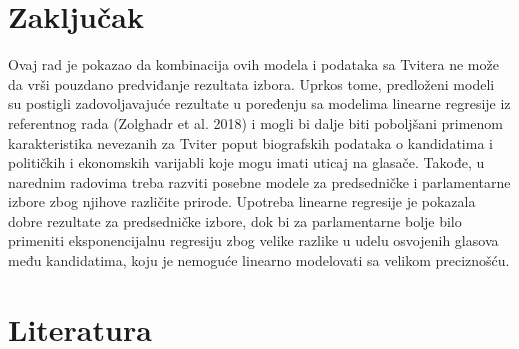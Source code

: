 \section{Zaključak}

Ovaj rad je pokazao da kombinacija ovih modela i podataka sa Tvitera ne može da vrši pouzdano
predviđanje rezultata izbora. Uprkos tome, predloženi modeli su postigli zadovoljavajuće rezultate u
poređenju sa modelima linearne regresije iz referentnog rada (Zolghadr et al. 2018) i mogli bi dalje
biti poboljšani primenom karakteristika nevezanih za Tviter poput biografskih podataka o kandidatima
i političkih i ekonomskih varijabli koje mogu imati uticaj na glasače. Takođe, u narednim radovima
treba razviti posebne modele za predsedničke i parlamentarne izbore zbog njihove različite prirode.
Upotreba linearne regresije je pokazala dobre rezultate za predsedničke izbore, dok bi za
parlamentarne bolje bilo primeniti eksponencijalnu regresiju zbog velike razlike u udelu osvojenih
glasova među kandidatima, koju je nemoguće linearno modelovati sa velikom preciznošću.

\section{Literatura}

